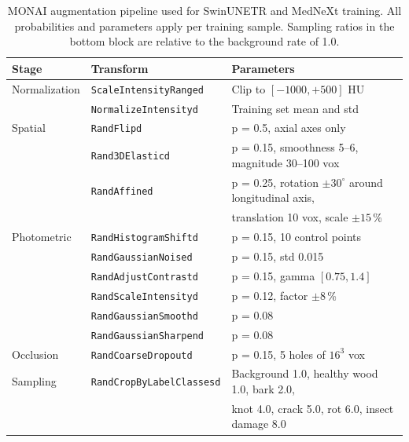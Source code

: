 \begin{table}[htbp]
\centering
\caption{MONAI augmentation pipeline used for SwinUNETR and MedNeXt training. All probabilities and parameters apply per training sample. Sampling ratios in the bottom block are relative to the background rate of 1.0.}
\label{tab:augmentation_pipeline}
\small
\begin{tabular}{lll}
    \toprule
    \textbf{Stage} & \textbf{Transform} & \textbf{Parameters} \\
    \midrule
    Normalization & \texttt{ScaleIntensityRanged} & Clip to $[-1000, +500]$ HU \\
                  & \texttt{NormalizeIntensityd}  & Training set mean and std \\
    \midrule
    Spatial       & \texttt{RandFlipd}            & p = 0.5, axial axes only \\
                  & \texttt{Rand3DElasticd}       & p = 0.15, smoothness 5--6, magnitude 30--100 vox \\
                  & \texttt{RandAffined}          & p = 0.25, rotation $\pm 30^\circ$ around longitudinal axis, \\
                  &                               & translation 10 vox, scale $\pm 15$\,\% \\
    \midrule
    Photometric   & \texttt{RandHistogramShiftd}  & p = 0.15, 10 control points \\
                  & \texttt{RandGaussianNoised}   & p = 0.15, std 0.015 \\
                  & \texttt{RandAdjustContrastd}  & p = 0.15, gamma $[0.75, 1.4]$ \\
                  & \texttt{RandScaleIntensityd}  & p = 0.12, factor $\pm 8$\,\% \\
                  & \texttt{RandGaussianSmoothd}  & p = 0.08 \\
                  & \texttt{RandGaussianSharpend} & p = 0.08 \\
    \midrule
    Occlusion     & \texttt{RandCoarseDropoutd}   & p = 0.15, 5 holes of $16^3$ vox \\
    \midrule
    Sampling      & \texttt{RandCropByLabelClassesd} & Background 1.0, healthy wood 1.0, bark 2.0, \\
                  &                                  & knot 4.0, crack 5.0, rot 6.0, insect damage 8.0 \\
    \bottomrule
\end{tabular}
\end{table}

